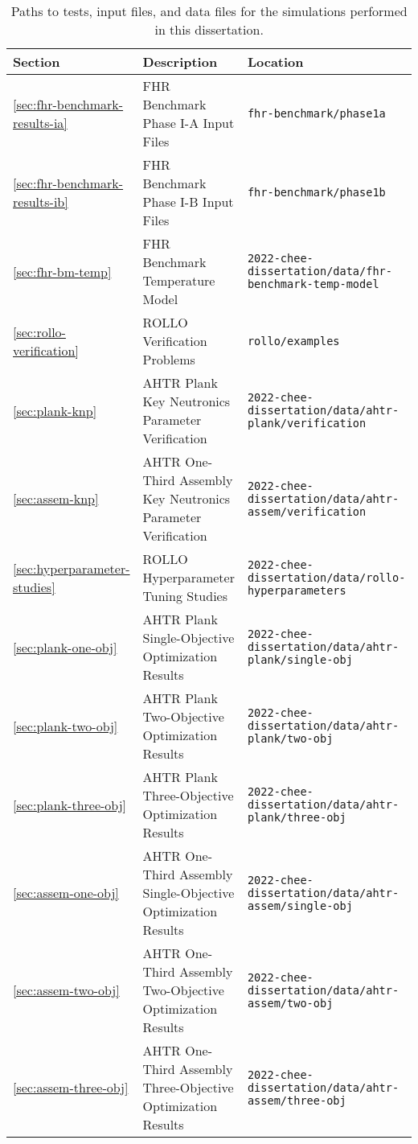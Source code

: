 \begin{landscape}
\begin{table}[htbp!]
    \centering
    \onehalfspacing
    \caption{Paths to tests, input files, and data files for the simulations performed 
    in this dissertation. }
    \label{tab:reproducibility}
    \begin{tabular}{p{2cm}p{9cm}p{11cm}}
    \toprule
    \textbf{Section} & \textbf{Description} & \textbf{Location} \\
    \midrule
    \ref{sec:fhr-benchmark-results-ia} & FHR Benchmark Phase I-A Input Files & 
    \texttt{fhr-benchmark/phase1a} \\ 
    \midrule
    \ref{sec:fhr-benchmark-results-ib} & FHR Benchmark Phase I-B Input Files & 
    \texttt{fhr-benchmark/phase1b} \\ 
    \midrule
    \ref{sec:fhr-bm-temp} & FHR Benchmark Temperature Model & 
    \texttt{2022-chee-dissertation/data/fhr-benchmark-temp-model} \\ 
    \midrule
    \ref{sec:rollo-verification} & ROLLO Verification Problems & 
    \texttt{rollo/examples} \\ 
    \midrule
    \ref{sec:plank-knp} & AHTR Plank Key Neutronics Parameter Verification & 
    \texttt{2022-chee-dissertation/data/ahtr-plank/verification} \\
    \midrule
    \ref{sec:assem-knp} & AHTR One-Third Assembly Key Neutronics Parameter Verification & 
    \texttt{2022-chee-dissertation/data/ahtr-assem/verification} \\
    \midrule
    \ref{sec:hyperparameter-studies} & ROLLO Hyperparameter Tuning Studies & 
    \texttt{2022-chee-dissertation/data/rollo-hyperparameters} \\
    \midrule
    \ref{sec:plank-one-obj} & AHTR Plank Single-Objective Optimization Results & 
    \texttt{2022-chee-dissertation/data/ahtr-plank/single-obj} \\
    \midrule
    \ref{sec:plank-two-obj} & AHTR Plank Two-Objective Optimization Results & 
    \texttt{2022-chee-dissertation/data/ahtr-plank/two-obj} \\
    \midrule
    \ref{sec:plank-three-obj} & AHTR Plank Three-Objective Optimization Results & 
    \texttt{2022-chee-dissertation/data/ahtr-plank/three-obj} \\
    \midrule
    \ref{sec:assem-one-obj} & AHTR One-Third Assembly Single-Objective Optimization Results & 
    \texttt{2022-chee-dissertation/data/ahtr-assem/single-obj} \\
    \midrule
    \ref{sec:assem-two-obj} & AHTR One-Third Assembly Two-Objective Optimization Results & 
    \texttt{2022-chee-dissertation/data/ahtr-assem/two-obj} \\
    \midrule
    \ref{sec:assem-three-obj} & AHTR One-Third Assembly Three-Objective Optimization Results & 
    \texttt{2022-chee-dissertation/data/ahtr-assem/three-obj} \\
    \bottomrule
    \end{tabular}
\end{table}
\end{landscape}